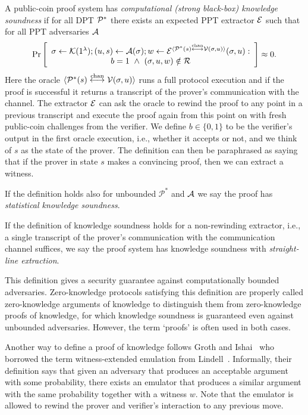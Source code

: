 \begin{definition}
A public-coin proof system has \emph{computational (strong black-box) knowledge soundness} if for all DPT $\mathcal{P}^*$ there exists an expected PPT extractor $\mathcal{E}$ such that for all PPT adversaries $\mathcal{A}$
$$\Pr\left[\begin{array}{c} \mathsf{\sigma}\gets \mathcal{K}(1^{\lambda});(u,s) \gets \mathcal{A}(\mathsf{\sigma}); w\gets \mathcal{E}^{\langle \mathcal{P}^*(s)\overset{\textnormal{chan}}{\longleftrightarrow}\mathcal{V}(\mathsf{\sigma},u)\rangle}(\mathsf{\sigma},u):\\ b=1 ~\wedge~ (\mathsf{\sigma},u,w)\notin \mathcal{R} \end{array}\right]\approx 0.$$ 
Here the oracle $\langle \mathcal{P}^*(s)\overset{\textnormal{chan}}{\longleftrightarrow}\mathcal{V}(\mathsf{\sigma},u)\rangle$ runs a full protocol execution and if the proof is successful it returns a transcript of the prover's communication with the channel. The extractor $\mathcal{E}$ can ask the oracle to rewind the proof to any point in a previous transcript and execute the proof again from this point on with fresh public-coin challenges from the verifier. We define $b\in \{0,1\}$ to be the verifier's output in the first oracle execution, i.e., whether it accepts or not, and we think of $s$ as the state of the prover. The definition can then be paraphrased as saying that if the prover in state $s$ makes a convincing proof, then we can extract a witness.

If the definition holds also for unbounded $\mathcal{P}^*$ and $\mathcal{A}$ we say the proof has {\em statistical knowledge soundness}. 

If the definition of knowledge soundness holds for a non-rewinding extractor, i.e., a single transcript of the prover's communication with the communication channel suffices, we say the proof system has knowledge soundness with {\em straight-line extraction}. 
\end{definition}
\noindent
This definition gives a security guarantee against computationally bounded adversaries. Zero-knowledge protocols satisfying this definition are properly called zero-knowledge arguments of knowledge to distinguish them from zero-knowledge proofs of knowledge, for which knowledge soundness is guaranteed even against unbounded adversaries. However, the term `proofs' is often used in both cases.

Another way to define a proof of knowledge follows Groth and Ishai~\cite{GrI08} who borrowed the term witness-extended emulation from Lindell~\cite{Lin03}. Informally, their definition says that given an adversary that produces an acceptable argument with some probability, there exists an emulator that produces a similar argument with the same probability together with a witness $w$. Note that the emulator is allowed to rewind the prover and verifier's interaction to any previous move.

